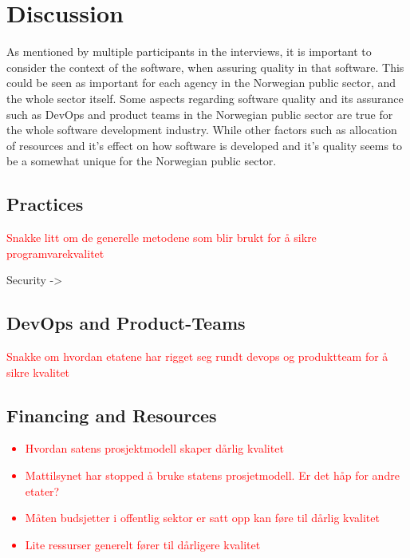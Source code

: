 \chapter{Discussion}
As mentioned by multiple participants in the interviews, it is important to consider the context of the software, when assuring quality in that software. This could be seen as important for each agency in the Norwegian public sector, and the whole sector itself. Some aspects regarding software quality and its assurance such as DevOps and product teams in the Norwegian public sector are true for the whole software development industry. While other factors such as allocation of resources and it's effect on how software is developed and it's quality seems to be a somewhat unique for the Norwegian public sector.

\section{Practices}
\textcolor{red}{Snakke litt om de generelle metodene som blir brukt for å sikre programvarekvalitet}

\cite{smm_2018}

Security -> \cite{sh_2018}

\section{DevOps and Product-Teams}
\textcolor{red}{Snakke om hvordan etatene har rigget seg rundt devops og produktteam for å sikre kvalitet}

\cite{am_2020}\cite{smm_2018}\cite{ml_2022}\cite{mm_2021}\cite{dsc_2019}

\section{Financing and Resources}
\textcolor{red}{\begin{itemize}
    \item Hvordan satens prosjektmodell skaper dårlig kvalitet
    \item Mattilsynet har stopped å bruke statens prosjetmodell. Er det håp for andre etater?
    \item Måten budsjetter i offentlig sektor er satt opp kan føre til dårlig kvalitet
    \item Lite ressurser generelt fører til dårligere kvalitet
\end{itemize}}

\cite{sh_2018}\cite{csw_2011}

